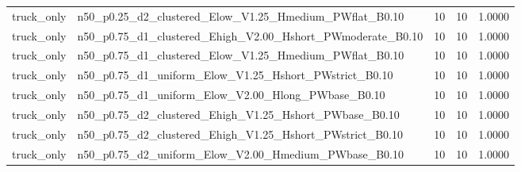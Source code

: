\begin{tabular}{llrrr}
truck_only & n50_p0.25_d2_clustered_Elow_V1.25_Hmedium_PWflat_B0.10 & 10 & 10 & 1.0000 \\
truck_only & n50_p0.75_d1_clustered_Ehigh_V2.00_Hshort_PWmoderate_B0.10 & 10 & 10 & 1.0000 \\
truck_only & n50_p0.75_d1_clustered_Elow_V1.25_Hmedium_PWflat_B0.10 & 10 & 10 & 1.0000 \\
truck_only & n50_p0.75_d1_uniform_Elow_V1.25_Hshort_PWstrict_B0.10 & 10 & 10 & 1.0000 \\
truck_only & n50_p0.75_d1_uniform_Elow_V2.00_Hlong_PWbase_B0.10 & 10 & 10 & 1.0000 \\
truck_only & n50_p0.75_d2_clustered_Ehigh_V1.25_Hshort_PWbase_B0.10 & 10 & 10 & 1.0000 \\
truck_only & n50_p0.75_d2_clustered_Ehigh_V1.25_Hshort_PWstrict_B0.10 & 10 & 10 & 1.0000 \\
truck_only & n50_p0.75_d2_uniform_Elow_V2.00_Hmedium_PWbase_B0.10 & 10 & 10 & 1.0000 \\
\bottomrule
\end{tabular}
